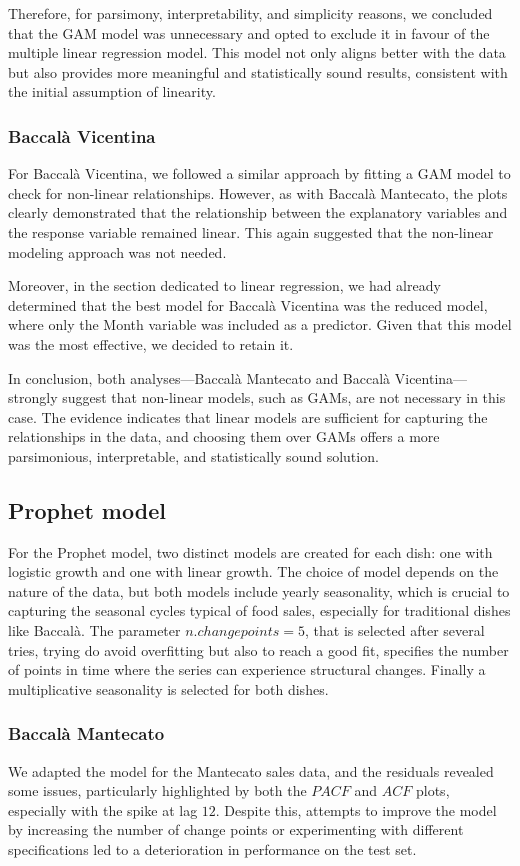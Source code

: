 \documentclass[10pt,twocolumn,letterpaper]{article}
\begin{document}
Therefore, for parsimony, interpretability, and simplicity reasons, we concluded that the GAM model was unnecessary and opted to exclude it in favour of the multiple linear regression model. This model not only aligns better with the data but also provides more meaningful and statistically sound results, consistent with the initial assumption of linearity.

\subsubsection{Baccalà Vicentina}
For Baccalà Vicentina, we followed a similar approach by fitting a GAM model to check for non-linear relationships. However, as with Baccalà Mantecato, the plots clearly demonstrated that the relationship between the explanatory variables and the response variable remained linear. This again suggested that the non-linear modeling approach was not needed.

Moreover, in the section dedicated to linear regression, we had already determined that the best model for Baccalà Vicentina was the reduced model, where only the Month variable was included as a predictor. Given that this model was the most effective, we decided to retain it.

In conclusion, both analyses—Baccalà Mantecato and Baccalà Vicentina—strongly suggest that non-linear models, such as GAMs, are not necessary in this case. The evidence indicates that linear models are sufficient for capturing the relationships in the data, and choosing them over GAMs offers a more parsimonious, interpretable, and statistically sound solution.

\subsection{Prophet model}
For the Prophet model, two distinct models are created for each dish: one with logistic growth and one with linear growth. The choice of model depends on the nature of the data, but both models include yearly seasonality, which is crucial to capturing the seasonal cycles typical of food sales, especially for traditional dishes like Baccalà. The parameter $n.changepoints=5$, that is selected after several tries, trying do avoid overfitting but also to reach a good fit, specifies the number of points in time where the series can experience structural changes. Finally a multiplicative seasonality is selected for both dishes.
\subsubsection{Baccalà Mantecato}
We adapted the model for the Mantecato sales data, and the residuals revealed some issues, particularly highlighted by both the $PACF$ and $ACF$ plots, especially with the spike at lag $12$. Despite this, attempts to improve the model by increasing the number of change points or experimenting with different specifications led to a deterioration in performance on the test set.
\end{document}
